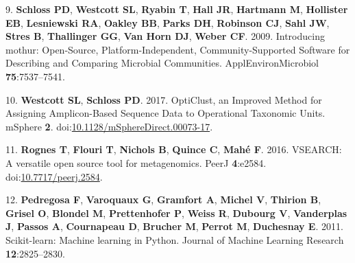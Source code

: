\documentclass[11pt,]{article}
\begin{document}
\hypertarget{ref-schloss_introducing_2009}{}
9. \textbf{Schloss PD}, \textbf{Westcott SL}, \textbf{Ryabin T},
\textbf{Hall JR}, \textbf{Hartmann M}, \textbf{Hollister EB},
\textbf{Lesniewski RA}, \textbf{Oakley BB}, \textbf{Parks DH},
\textbf{Robinson CJ}, \textbf{Sahl JW}, \textbf{Stres B},
\textbf{Thallinger GG}, \textbf{Van Horn DJ}, \textbf{Weber CF}. 2009.
Introducing mothur: Open-Source, Platform-Independent,
Community-Supported Software for Describing and Comparing Microbial
Communities. ApplEnvironMicrobiol \textbf{75}:7537--7541.

\hypertarget{ref-westcott_opticlust_2017}{}
10. \textbf{Westcott SL}, \textbf{Schloss PD}. 2017. OptiClust, an
Improved Method for Assigning Amplicon-Based Sequence Data to
Operational Taxonomic Units. mSphere \textbf{2}.
doi:\href{https://doi.org/10.1128/mSphereDirect.00073-17}{10.1128/mSphereDirect.00073-17}.

\hypertarget{ref-rognes_vsearch_2016}{}
11. \textbf{Rognes T}, \textbf{Flouri T}, \textbf{Nichols B},
\textbf{Quince C}, \textbf{Mahé F}. 2016. VSEARCH: A versatile open
source tool for metagenomics. PeerJ \textbf{4}:e2584.
doi:\href{https://doi.org/10.7717/peerj.2584}{10.7717/peerj.2584}.

\hypertarget{ref-scikit-learn}{}
12. \textbf{Pedregosa F}, \textbf{Varoquaux G}, \textbf{Gramfort A},
\textbf{Michel V}, \textbf{Thirion B}, \textbf{Grisel O},
\textbf{Blondel M}, \textbf{Prettenhofer P}, \textbf{Weiss R},
\textbf{Dubourg V}, \textbf{Vanderplas J}, \textbf{Passos A},
\textbf{Cournapeau D}, \textbf{Brucher M}, \textbf{Perrot M},
\textbf{Duchesnay E}. 2011. Scikit-learn: Machine learning in Python.
Journal of Machine Learning Research \textbf{12}:2825--2830.
\end{document}
